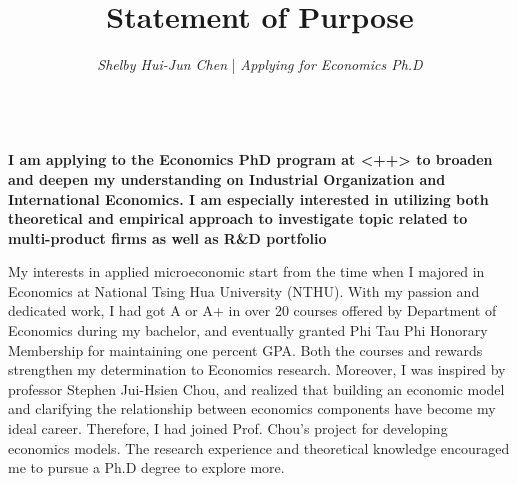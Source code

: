 \documentclass[12pt]{article}
\title{\vspace{-3ex}\textbf{Statement of Purpose}\vspace{-3ex}} %
\author{\textit{Shelby Hui-Jun Chen} | \textit{Applying for Economics Ph.D}}
\date{\vspace{-6ex}}
\newcommand{\school}{<++>}
\begin{document}
\maketitle %
\hrulefill\\
\textbf{I am applying to the Economics PhD program at \school{} to broaden and deepen my understanding on Industrial Organization and International Economics. I am especially interested in utilizing both theoretical and empirical approach to investigate topic related to multi-product firms as well as R\&D portfolio}

My interests in applied microeconomic start from the time when I majored in Economics at National Tsing Hua University (NTHU).
With my passion and dedicated work, I had got A or A+ in over 20 courses offered by Department of Economics during my bachelor, and eventually granted Phi Tau Phi Honorary Membership for maintaining one percent GPA.
Both the courses and rewards strengthen my determination to Economics research.
Moreover, I was inspired by professor Stephen Jui-Hsien Chou, and realized that building an economic model and clarifying the relationship between economics components have become my ideal career.
Therefore, I had joined Prof. Chou's project for developing economics models.
The research experience and theoretical knowledge encouraged me to pursue a Ph.D degree to explore more.
\end{document}
